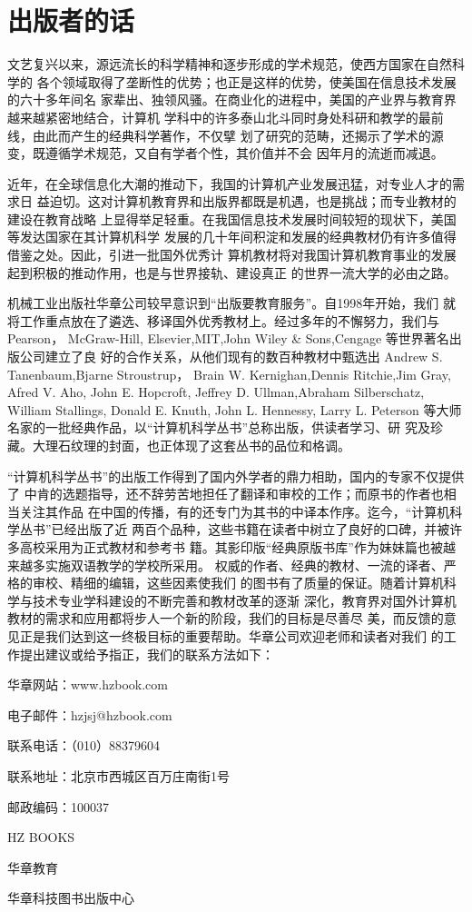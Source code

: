 
\chapter*{出版者的话}

文艺复兴以来，源远流长的科学精神和逐步形成的学术规范，使西方国家在自然科学的
各个领域取得了垄断性的优势；也正是这样的优势，使美国在信息技术发展的六十多年间名
家辈出、独领风骚。在商业化的进程中，美国的产业界与教育界越来越紧密地结合，计算机
学科中的许多泰山北斗同时身处科研和教学的最前线，由此而产生的经典科学著作，不仅擘
划了研究的范畴，还揭示了学术的源变，既遵循学术规范，又自有学者个性，其价值并不会
因年月的流逝而减退。

近年，在全球信息化大潮的推动下，我国的计算机产业发展迅猛，对专业人才的需求日
益迫切。这对计算机教育界和出版界都既是机遇，也是挑战；而专业教材的建设在教育战略
上显得举足轻重。在我国信息技术发展时间较短的现状下，美国等发达国家在其计算机科学
发展的几十年间积淀和发展的经典教材仍有许多值得借鉴之处。因此，引进一批国外优秀计
算机教材将对我国计算机教育事业的发展起到积极的推动作用，也是与世界接轨、建设真正
的世界一流大学的必由之路。

机械工业出版社华章公司较早意识到“出版要教育服务”。自1998年开始，我们
就将工作重点放在了遴选、移译国外优秀教材上。经过多年的不懈努力，我们与 Pearson，
McGraw-Hill, Elsevier,MIT,John Wiley \& Sons,Cengage 等世界著名出版公司建立了良
好的合作关系，从他们现有的数百种教材中甄选出 Andrew S. Tanenbaum,Bjarne Stroustrup，
Brain W. Kernighan,Dennis Ritchie,Jim Gray, Afred V. Aho, John E. Hopcroft, Jeffrey D.
Ullman,Abraham Silberschatz, William Stallings, Donald E. Knuth, John L. Hennessy, Larry L.
Peterson 等大师名家的一批经典作品，以“计算机科学丛书”总称出版，供读者学习、研
究及珍藏。大理石纹理的封面，也正体现了这套丛书的品位和格调。

“计算机科学丛书”的出版工作得到了国内外学者的鼎力相助，国内的专家不仅提供了
中肯的选题指导，还不辞劳苦地担任了翻译和审校的工作；而原书的作者也相当关注其作品
在中国的传播，有的还专门为其书的中译本作序。迄今，“计算机科学丛书”已经出版了近
两百个品种，这些书籍在读者中树立了良好的口碑，并被许多高校采用为正式教材和参考书
籍。其影印版“经典原版书库”作为妹妹篇也被越来越多实施双语教学的学校所采用。
权威的作者、经典的教材、一流的译者、严格的审校、精细的编辑，这些因素使我们
的图书有了质量的保证。随着计算机科学与技术专业学科建设的不断完善和教材改革的逐渐
深化，教育界对国外计算机教材的需求和应用都将步人一个新的阶段，我们的目标是尽善尽
美，而反馈的意见正是我们达到这一终极目标的重要帮助。华章公司欢迎老师和读者对我们
的工作提出建议或给予指正，我们的联系方法如下：

华章网站：www.hzbook.com

电子邮件：hzjsj@hzbook.com

联系电话：（010）88379604

联系地址：北京市西城区百万庄南街1号

邮政编码：100037

HZ BOOKS

华章教育

华章科技图书出版中心
